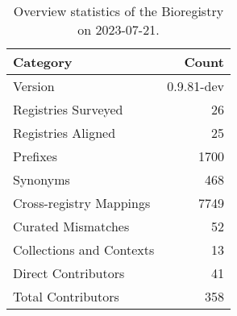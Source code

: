 \begin{table}
\caption{Overview statistics of the Bioregistry on 2023-07-21.}
\label{tab:bioregistry-summary}
\begin{tabular}{lr}
\toprule
Category & Count \\
\midrule
Version & 0.9.81-dev \\
Registries Surveyed & 26 \\
Registries Aligned & 25 \\
Prefixes & 1700 \\
Synonyms & 468 \\
Cross-registry Mappings & 7749 \\
Curated Mismatches & 52 \\
Collections and Contexts & 13 \\
Direct Contributors & 41 \\
Total Contributors & 358 \\
\bottomrule
\end{tabular}
\end{table}
